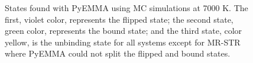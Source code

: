 \documentclass[
  journal=usp, %
  manuscript=final-report,
  year=2023,
  volume=1,
]{cup-journal}
\begin{document}
{\begin{figure}[hbt!]
\caption{States found with PyEMMA using MC simulations at 7000 K. The first, violet color, represents the flipped state; the second state, green color, represents the bound state; and the third state, color yellow, is the unbinding state for all systems except for MR-STR where PyEMMA could not split the flipped and bound states. }
\label{fig:all-states}
\end{figure}





}
\end{document}

